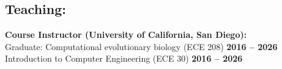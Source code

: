 \documentclass[margin,line,letterpaper]{resume}
\begin{document}
\begin{resume}



    \section{\mysidestyle Teaching:}

    \textbf{Course Instructor (University of California, San Diego):}\vspace{2mm}\\\vspace{1mm}%
     Graduate: Computational evolutionary biology (ECE 208)  \hfill \textbf{2016 -- 2026}\\
     Introduction to Computer Engineering  (ECE 30) \hfill \textbf{2016 -- 2026}


\end{resume}
\end{document}
